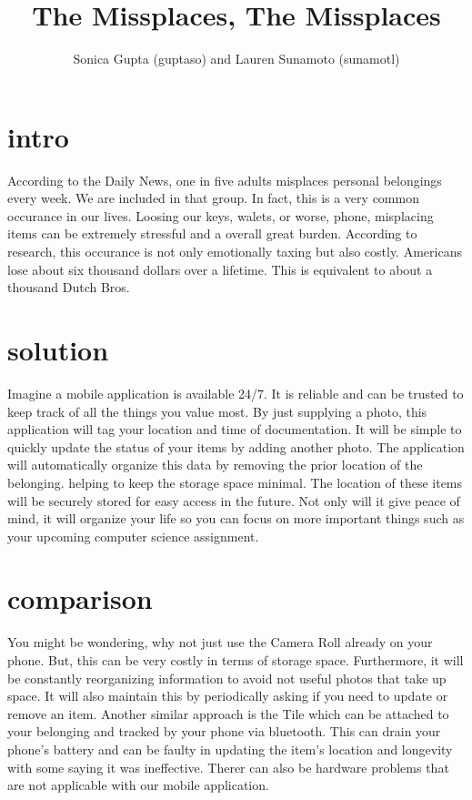\documentclass[12pt]{article}
\title{The Missplaces, The Missplaces}
\author{Sonica Gupta (guptaso) and Lauren Sunamoto (sunamotl)}
\begin{document}
\maketitle 


\section{intro}
	According to the Daily News, one in five adults misplaces personal belongings every week. We are included in that group. In fact, this is a very common occurance in our lives. Loosing our keys, walets, or worse, phone, misplacing items can be extremely stressful and a overall great burden. According to research, this occurance is not only emotionally taxing but also costly. Americans lose about six thousand dollars over a lifetime. This is equivalent to about a thousand Dutch Bros. 

\section{solution}
	Imagine a mobile application is available 24/7. It is reliable and can be trusted to keep track of all the things you value most. By just supplying a photo, this application will tag your location and time of documentation. It will be simple to quickly update the status of your items by adding another photo. The application will automatically organize this data by removing the prior location of the belonging. helping to keep the storage space minimal. The location of these items will be securely stored for easy access in the future. Not only will it give peace of mind, it will organize your life so you can focus on more important things such as your upcoming computer science assignment. 


\section{comparison} 
	You might be wondering, why not just use the Camera Roll already on your phone. But, this can be very costly in terms of storage space. Furthermore, it will be constantly reorganizing information to avoid not useful photos that take up space. It will also maintain this by periodically asking if you need to update or remove an item. Another similar approach is the Tile which can be attached to your belonging and tracked by your phone via bluetooth. This can drain your phone's battery and can be faulty in updating the item's location and longevity with some saying it was ineffective. Therer can also be hardware problems that are not applicable with our mobile application. 
\end{document}
